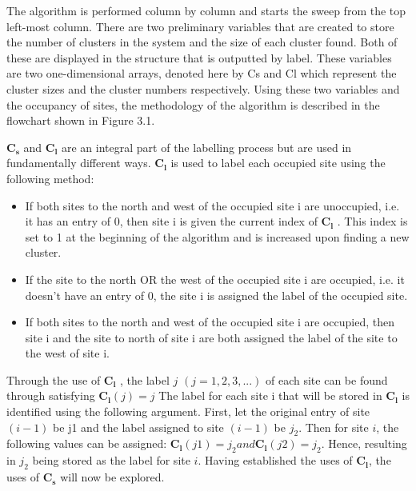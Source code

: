 The algorithm is performed column by column and starts the sweep from the top left-most column. 
There are two preliminary variables that are created to store the number of clusters in the system and the size of each cluster found. 
Both of these are displayed in the structure that is outputted by label. 
These variables are two one-dimensional arrays, denoted here by Cs and Cl which represent the cluster sizes and the cluster numbers respectively. 
Using these two variables and the occupancy of sites, the methodology of the algorithm is described in the flowchart shown in Figure 3.1.

$\mathbf{C_s}$ and $\mathbf{C_l}$ are an integral part of the labelling process but are used in fundamentally different ways.
$\mathbf{C_l}$ is used to label each occupied site using the following method:

\begin{itemize}
    \item If both sites to the north and west of the occupied site i are unoccupied, 
    i.e. it has an entry of 0, then site i is given the current index of $\mathbf{C_l}$ . 
    This index is set to 1 at the beginning of the algorithm and is increased upon finding a new cluster.
    \item If the site to the north OR the west of the occupied site i are occupied, i.e. 
    it doesn’t have an entry of 0, the site i is assigned the label of the occupied site.
    \item If both sites to the north and west of the occupied site i are occupied, then site i and the site to north of site 
    i are both assigned the label of the site to the west of site i.
\end{itemize}

Through the use of $\mathbf{C_l}$ , the label $j$ $(j = 1,2,3,...)$ of each site can be found through satisfying $\mathbf{C_l}(j) = j$ 
The label for each site i that will be stored in $\mathbf{C_l}$ is identified using the following argument. 
First, let the original entry of site $(i - 1)$ be j1 and the label assigned to site $(i − 1)$ be $j_2$. 
Then for site $i$, the following values can be assigned: $\mathbf{C_l}(j1) = j_2 and \mathbf{C_l}(j2) = j_2$.
Hence, resulting in $j_2$ being stored as the label for site $i$. Having established the uses of $\mathbf{C_l}$, the uses of $\mathbf{C_s}$ will now be explored.

